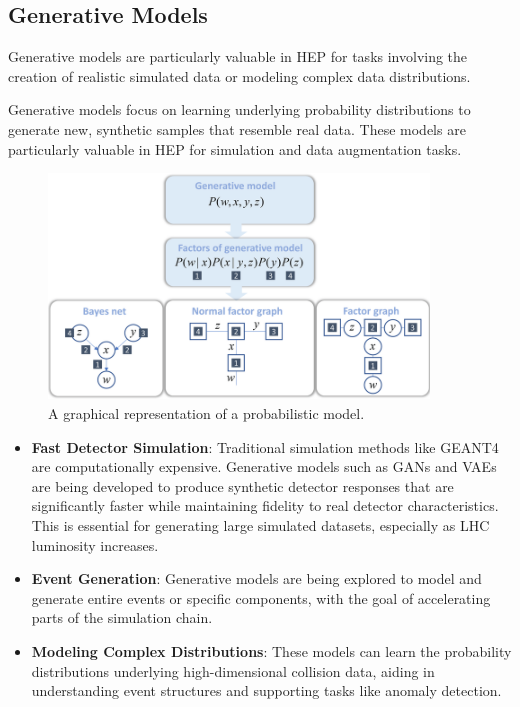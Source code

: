\documentclass[letterpaper,12pt]{article}
\begin{document}
\begin{spacing}{1.125}
\subsection{ Generative Models}

Generative models are particularly valuable in HEP for tasks involving the creation of realistic simulated data or modeling complex data distributions.

Generative models focus on learning underlying probability distributions to generate new, synthetic samples that resemble real data. These models are particularly valuable in HEP for simulation and data augmentation tasks.

\begin{figure}[H]
\centering
\includegraphics[width=0.9\textwidth]{generative.png}
\caption{A graphical representation of a probabilistic model.}
\end{figure}

\begin{itemize}
    \item \textbf{Fast Detector Simulation}: Traditional simulation methods like GEANT4\cite{geant4} are computationally expensive. Generative models such as GANs and VAEs are being developed to produce synthetic detector responses that are significantly faster while maintaining fidelity to real detector characteristics. This is essential for generating large simulated datasets, especially as LHC luminosity increases.
    
    \item \textbf{Event Generation}: Generative models are being explored to model and generate entire events or specific components, with the goal of accelerating parts of the simulation chain.
    
    \item \textbf{Modeling Complex Distributions}: These models can learn the probability distributions underlying high-dimensional collision data, aiding in understanding event structures and supporting tasks like anomaly detection.
    

\end{itemize}
\end{spacing}
\end{document}
